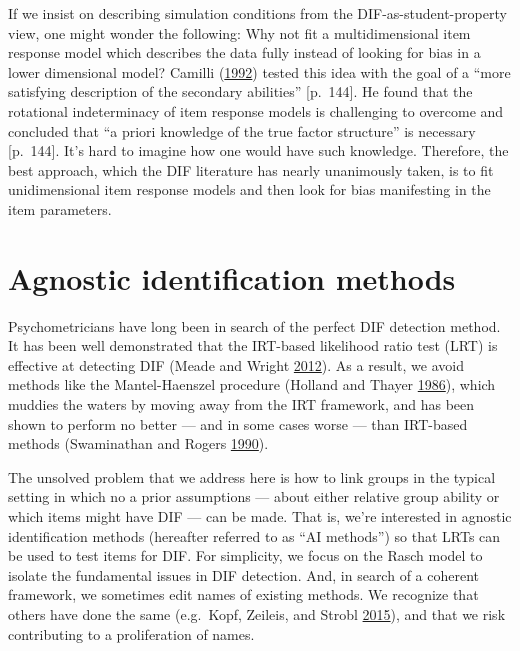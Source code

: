 \documentclass[
  11pt,
]{article}
\begin{document}
If we insist on describing simulation conditions from the DIF-as-student-property view, one might wonder the following: Why not fit a multidimensional item response model which describes the data fully instead of looking for bias in a lower dimensional model? Camilli (\protect\hyperlink{ref-camilli1992conceptual}{1992}) tested this idea with the goal of a \enquote{more satisfying description of the secondary abilities} {[}p.~144{]}. He found that the rotational indeterminacy of item response models is challenging to overcome and concluded that \enquote{a priori knowledge of the true factor structure} is necessary {[}p.~144{]}. It's hard to imagine how one would have such knowledge. Therefore, the best approach, which the DIF literature has nearly unanimously taken, is to fit unidimensional item response models and then look for bias manifesting in the item parameters.

\hypertarget{agnostic-identification-methods}{%
\section{Agnostic identification methods}\label{agnostic-identification-methods}}

Psychometricians have long been in search of the perfect DIF detection method. It has been well demonstrated that the IRT-based likelihood ratio test (LRT) is effective at detecting DIF (Meade and Wright \protect\hyperlink{ref-meade2012solving}{2012}). As a result, we avoid methods like the Mantel-Haenszel procedure (Holland and Thayer \protect\hyperlink{ref-holland1986differential}{1986}), which muddies the waters by moving away from the IRT framework, and has been shown to perform no better --- and in some cases worse --- than IRT-based methods (Swaminathan and Rogers \protect\hyperlink{ref-swaminathan1990detecting}{1990}).

The unsolved problem that we address here is how to link groups in the typical setting in which no a prior assumptions --- about either relative group ability or which items might have DIF --- can be made. That is, we're interested in agnostic identification methods (hereafter referred to as \enquote{AI methods}) so that LRTs can be used to test items for DIF. For simplicity, we focus on the Rasch model to isolate the fundamental issues in DIF detection. And, in search of a coherent framework, we sometimes edit names of existing methods. We recognize that others have done the same (e.g.~Kopf, Zeileis, and Strobl \protect\hyperlink{ref-kopf2015framework}{2015}), and that we risk contributing to a proliferation of names.
\end{document}
